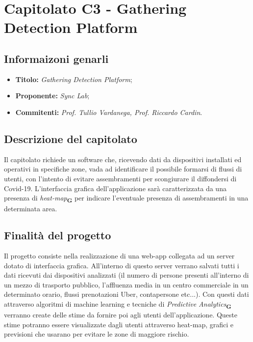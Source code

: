 \section{Capitolato C3 - Gathering Detection Platform}
\subsection{Informaizoni genarli}
\begin{itemize}
    \item \textbf{Titolo:} \textit{Gathering Detection Platform};
    \item \textbf{Proponente:} \textit{Sync Lab};
    \item \textbf{Commitenti:} \textit{Prof. Tullio Vardanega, Prof. Riccardo Cardin}.
\end{itemize}
\subsection{Descrizione del capitolato}
Il capitolato richiede un software che, ricevendo dati da dispositivi installati ed operativi in specifiche zone, 
vada ad identificare il possibile formarsi di flussi di utenti, con l'intento di evitare assembramenti per scongiurare il diffondersi di Covid-19.
L'interfaccia grafica dell'applicazione sarà caratterizzata da una presenza di \textit{heat-map}\textsubscript{\textbf{G}} per indicare l'eventuale presenza di assembramenti in una determinata area.
\subsection{Finalità del progetto}
Il progetto consiste nella realizzazione di una web-app collegata ad un server dotato di interfaccia grafica. All'interno di questo server verrano salvati tutti i dati ricevuti dai dispositivi analizzati 
(il numero di persone presenti all'interno di un mezzo di trasporto pubblico, l'affluenza media in un centro commerciale in un determinato orario, flussi prenotazioni Uber, contapersone etc...). 
Con questi dati attraverso algoritmi di machine learning e tecniche di \textit{Predictive Analytics}\textsubscript{\textbf{G}} verranno create delle stime da fornire poi agli utenti dell'applicazione. 
Queste stime potranno essere visualizzate dagli utenti attraverso heat-map, grafici e previsioni che usarano per evitare le zone di maggiore rischio.
